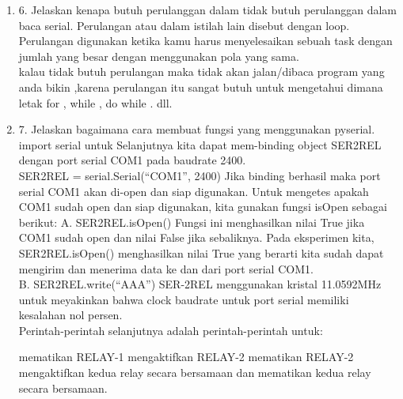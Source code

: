 \begin{enumerate}
\item 6. Jelaskan kenapa butuh perulanggan dalam tidak butuh perulanggan dalam baca serial.
Perulangan atau dalam istilah lain disebut dengan loop. Perulangan digunakan ketika kamu harus menyelesaikan sebuah task dengan jumlah yang besar dengan menggunakan pola yang sama.\\
kalau tidak butuh perulangan maka tidak akan jalan/dibaca program yang anda bikin ,karena perulangan itu sangat butuh untuk mengetahui dimana letak for , while , do while . dll.\\

\item 7. Jelaskan bagaimana cara membuat fungsi yang menggunakan pyserial.
import serial untuk Selanjutnya kita dapat mem-binding object SER2REL dengan port serial COM1 pada baudrate 2400.\\

SER2REL = serial.Serial(“COM1”, 2400)
Jika binding berhasil maka port serial COM1 akan di-open dan siap digunakan. Untuk mengetes apakah COM1 sudah open dan siap digunakan, kita gunakan fungsi isOpen sebagai berikut:
A. SER2REL.isOpen()
Fungsi ini menghasilkan nilai True jika COM1 sudah open dan nilai False jika sebaliknya. Pada eksperimen kita, SER2REL.isOpen() menghasilkan nilai True yang berarti kita sudah dapat mengirim dan menerima data ke dan dari port serial COM1.\\

B. SER2REL.write(“AAA”)
SER-2REL menggunakan kristal 11.0592MHz untuk meyakinkan bahwa clock baudrate untuk port serial memiliki kesalahan nol persen.\\

Perintah-perintah selanjutnya adalah perintah-perintah untuk:

mematikan RELAY-1
mengaktifkan RELAY-2
mematikan RELAY-2
mengaktifkan kedua relay secara bersamaan
dan mematikan kedua relay secara bersamaan.\\

\end{enumerate}
